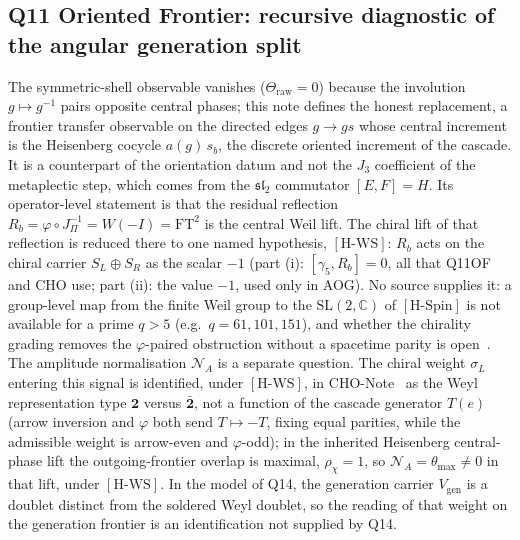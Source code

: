 \documentclass[11pt,a4paper]{article}
\theoremstyle{definition}
\newcommand{\SL}{\mathrm{SL}}
\newcommand{\HSpin}{\ensuremath{[\mathrm{H\text{-}Spin}]}}
\newcommand{\HWS}{\ensuremath{[\mathrm{H\text{-}WS}]}}
\begin{document}
    \subsection{Q11 Oriented Frontier: recursive diagnostic of the angular generation
    split~\cite{Beau2026q11of}}
      The symmetric-shell observable vanishes ($\Theta_{\mathrm{raw}}=0$) because the involution
      $g\mapsto g^{-1}$ pairs opposite central phases; this note defines the honest replacement, a frontier
      transfer observable on the directed edges $g\to gs$ whose central increment is the Heisenberg cocycle
      $a(g)\,s_b$, the discrete oriented increment of the cascade.
      It is a counterpart of the orientation datum and not the $J_3$ coefficient of the metaplectic step, which comes
      from the $\mathfrak{sl}_2$ commutator $[E,F]=H$.
      Its operator-level statement is that the residual reflection
      $R_b=\varphi\circ J_\Pi^{-1}=W(-I)=\mathrm{FT}^2$ is the central Weil lift.
      The chiral lift of that reflection is reduced there to one named hypothesis, \HWS{}: $R_b$ acts on the
      chiral carrier $S_L\oplus S_R$ as the scalar $-1$ (part (i): $[\gamma_5,R_b]=0$, all that Q11OF and CHO use; part
      (ii): the value $-1$, used only in AOG).
      No source supplies it: a group-level map from the finite Weil group to the $\SL(2,\mathbb{C})$ of \HSpin{} is not
      available for a prime $q>5$ (e.g.\ $q=61,101,151$), and whether the chirality grading removes the $\varphi$-paired obstruction without a spacetime parity
      is open~\cite{Beau2026q14}.
      The amplitude normalisation $\mathcal N_A$ is a separate question.
      The chiral weight $\sigma_L$ entering this signal is identified, under \HWS{}, in
      CHO-Note~\cite{Beau2026cho} as the Weyl
      representation type $\mathbf{2}$ versus $\bar{\mathbf{2}}$, not a function of the cascade generator $T(e)$
      (arrow inversion and $\varphi$ both send $T\mapsto -T$, fixing equal parities, while the admissible weight is
      arrow-even and $\varphi$-odd); in the inherited Heisenberg central-phase lift the outgoing-frontier overlap is
      maximal, $\rho_\chi=1$, so $\mathcal N_A=\theta_{\max}\neq0$ in that lift, under \HWS{}.
      In the model of Q14, the generation carrier $V_{\mathrm{gen}}$ is a doublet distinct from the soldered Weyl
      doublet, so the reading of that weight on the generation frontier is an identification not supplied by Q14.
\end{document}
